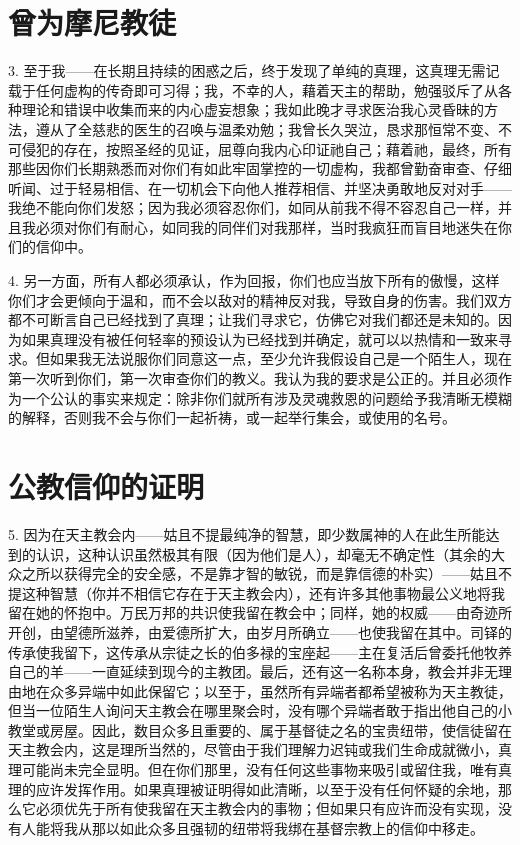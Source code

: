 
\section{曾为摩尼教徒}

3. 至于我——在长期且持续的困惑之后，终于发现了单纯的真理，这真理无需记载于任何虚构的传奇即可习得；我，不幸的人，藉着天主的帮助，勉强驳斥了从各种理论和错误中收集而来的内心虚妄想象；我如此晚才寻求医治我心灵昏昧的方法，遵从了全慈悲的医生的召唤与温柔劝勉；我曾长久哭泣，恳求那恒常不变、不可侵犯的存在，按照圣经的见证，屈尊向我内心印证祂自己；藉着祂，最终，所有那些因你们长期熟悉而对你们有如此牢固掌控的一切虚构，我都曾勤奋审查、仔细听闻、过于轻易相信、在一切机会下向他人推荐相信、并坚决勇敢地反对对手——我绝不能向你们发怒；因为我必须容忍你们，如同从前我不得不容忍自己一样，并且我必须对你们有耐心，如同我的同伴们对我那样，当时我疯狂而盲目地迷失在你们的信仰中。\par

4. 另一方面，所有人都必须承认，作为回报，你们也应当放下所有的傲慢，这样你们才会更倾向于温和，而不会以敌对的精神反对我，导致自身的伤害。我们双方都不可断言自己已经找到了真理；让我们寻求它，仿佛它对我们都还是未知的。因为如果真理没有被任何轻率的预设认为已经找到并确定，就可以以热情和一致来寻求。但如果我无法说服你们同意这一点，至少允许我假设自己是一个陌生人，现在第一次听到你们，第一次审查你们的教义。我认为我的要求是公正的。并且必须作为一个公认的事实来规定：除非你们就所有涉及灵魂救恩的问题给予我清晰无模糊的解释，否则我不会与你们一起祈祷，或一起举行集会，或使用的名号。\par


\section{公教信仰的证明}

5. 因为在天主教会内——姑且不提最纯净的智慧，即少数属神的人在此生所能达到的认识，这种认识虽然极其有限（因为他们是人），却毫无不确定性（其余的大众之所以获得完全的安全感，不是靠才智的敏锐，而是靠信德的朴实）——姑且不提这种智慧（你并不相信它存在于天主教会内），还有许多其他事物最公义地将我留在她的怀抱中。万民万邦的共识使我留在教会中；同样，她的权威——由奇迹所开创，由望德所滋养，由爱德所扩大，由岁月所确立——也使我留在其中。司铎的传承使我留下，这传承从宗徒之长的伯多禄的宝座起——主在复活后曾委托他牧养自己的羊——一直延续到现今的主教团。最后，还有这一名称本身，教会并非无理由地在众多异端中如此保留它；以至于，虽然所有异端者都希望被称为天主教徒，但当一位陌生人询问天主教会在哪里聚会时，没有哪个异端者敢于指出他自己的小教堂或房屋。因此，数目众多且重要的、属于基督徒之名的宝贵纽带，使信徒留在天主教会内，这是理所当然的，尽管由于我们理解力迟钝或我们生命成就微小，真理可能尚未完全显明。但在你们那里，没有任何这些事物来吸引或留住我，唯有真理的应许发挥作用。如果真理被证明得如此清晰，以至于没有任何怀疑的余地，那么它必须优先于所有使我留在天主教会内的事物；但如果只有应许而没有实现，没有人能将我从那以如此众多且强韧的纽带将我绑在基督宗教上的信仰中移走。\par

